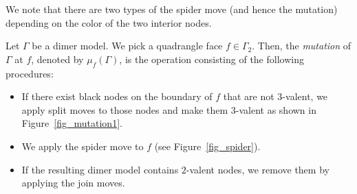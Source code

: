 \documentclass[pdftex]{sigma}%
\numberwithin{equation}{section}
\numberwithin{figure}{section}
\numberwithin{table}{section}
\begin{document}
We note that there are two types of the spider move (and hence the mutation) depending on the color of the two interior nodes.

\begin{Definition}\label{def_mutation}
Let $\Gamma$ be a dimer model. We pick a quadrangle face $f\in\Gamma_2$.
Then, the \emph{mutation} of $\Gamma$ at $f$, denoted by $\mu_f(\Gamma)$, is the operation consisting of the following procedures:
\begin{itemize}\itemsep=0pt
\item[(I)] If there exist black nodes on the boundary of $f$ that are not $3$-valent,
we apply split moves to those nodes and make them $3$-valent as shown in Figure~\ref{fig_mutation1}.
\item[(II)] We apply the spider move to $f$ (see Figure~\ref{fig_spider}).
\item[(III)] If the resulting dimer model contains $2$-valent nodes, we remove them by applying the join moves.
\end{itemize}
\end{Definition}
\end{document}
